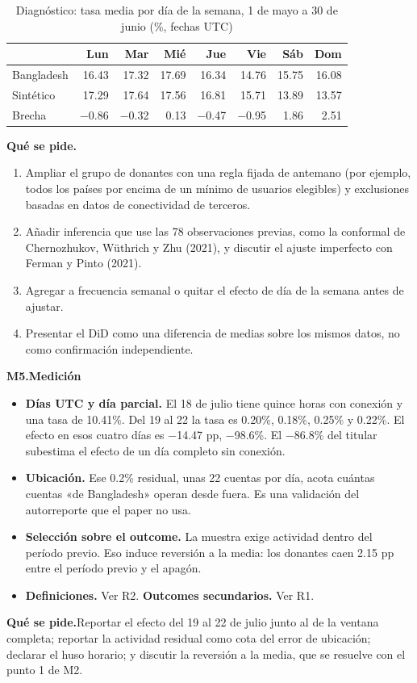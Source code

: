 \documentclass[11pt,a4paper]{article}
\newcommand{\coment}[2]{\medskip\noindent\textbf{#1.\enspace #2}\par\nopagebreak}
\newcommand{\pide}{\par\noindent\textbf{Qué se pide.}\enspace}
\begin{document}
\begin{table}[h]
\small
\caption{Diagnóstico: tasa media por día de la semana, 1 de mayo a 30 de junio (\%, fechas UTC)}
\label{tab:m4}
\begin{tabularx}{\textwidth}{@{}Yrrrrrrr@{}}
\toprule
 & Lun & Mar & Mié & Jue & Vie & Sáb & Dom \\
\midrule
Bangladesh & 16.43 & 17.32 & 17.69 & 16.34 & 14.76 & 15.75 & 16.08 \\
Sintético & 17.29 & 17.64 & 17.56 & 16.81 & 15.71 & 13.89 & 13.57 \\
Brecha & −0.86 & −0.32 & 0.13 & −0.47 & −0.95 & 1.86 & 2.51 \\
\bottomrule
\end{tabularx}
\par{}
\end{table}

\pide
\begin{enumerate}
\item Ampliar el grupo de donantes con una regla fijada de antemano (por ejemplo, todos los países por
encima de un mínimo de usuarios elegibles) y exclusiones basadas en datos de conectividad de terceros.
\item Añadir inferencia que use las 78 observaciones previas, como la conformal de Chernozhukov,
Wüthrich y Zhu (2021), y discutir el ajuste imperfecto con Ferman y Pinto (2021).
\item Agregar a frecuencia semanal o quitar el efecto de día de la semana antes de ajustar.
\item Presentar el DiD como una diferencia de medias sobre los mismos datos, no como confirmación
independiente.
\end{enumerate}

\coment{M5}{Medición}
\begin{itemize}
\item \textbf{Días UTC y día parcial.} El 18 de julio tiene quince horas con conexión y una tasa de
10.41\%. Del 19 al 22 la tasa es 0.20\%, 0.18\%, 0.25\% y 0.22\%. El efecto en esos cuatro días es
−14.47 pp, −98.6\%. El −86.8\% del titular subestima el efecto de un día completo sin conexión.
\item \textbf{Ubicación.} Ese 0.2\% residual, unas 22 cuentas por día, acota cuántas cuentas
«de Bangladesh» operan desde fuera. Es una validación del autorreporte que el paper no usa.
\item \textbf{Selección sobre el outcome.} La muestra exige actividad dentro del período previo. Eso
induce reversión a la media: los donantes caen 2.15 pp entre el período previo y el apagón.
\item \textbf{Definiciones.} Ver R2. \textbf{Outcomes secundarios.} Ver R1.
\end{itemize}
\pide Reportar el efecto del 19 al 22 de julio junto al de la ventana completa; reportar la actividad
residual como cota del error de ubicación; declarar el huso horario; y discutir la reversión a la
media, que se resuelve con el punto 1 de M2.
\end{document}
